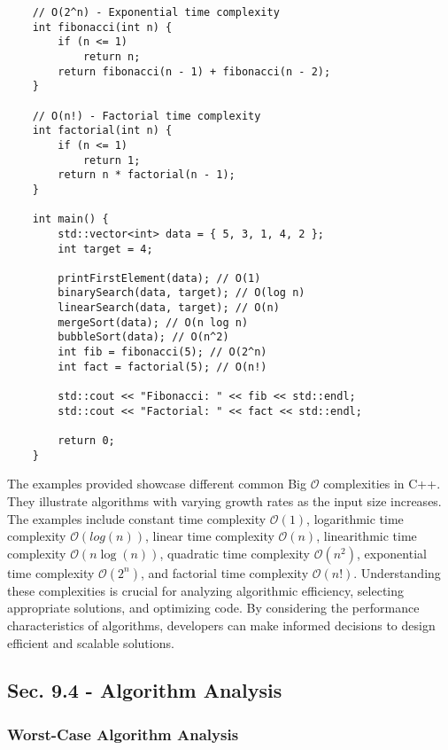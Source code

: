 \begin{solution}
\begin{verbatim}
    // O(2^n) - Exponential time complexity
    int fibonacci(int n) {
        if (n <= 1)
            return n;
        return fibonacci(n - 1) + fibonacci(n - 2);
    }

    // O(n!) - Factorial time complexity
    int factorial(int n) {
        if (n <= 1)
            return 1;
        return n * factorial(n - 1);
    }

    int main() {
        std::vector<int> data = { 5, 3, 1, 4, 2 };
        int target = 4;

        printFirstElement(data); // O(1)
        binarySearch(data, target); // O(log n)
        linearSearch(data, target); // O(n)
        mergeSort(data); // O(n log n)
        bubbleSort(data); // O(n^2)
        int fib = fibonacci(5); // O(2^n)
        int fact = factorial(5); // O(n!)

        std::cout << "Fibonacci: " << fib << std::endl;
        std::cout << "Factorial: " << fact << std::endl;

        return 0;
    }
    \end{verbatim}

    \horizontalline

    The examples provided showcase different common Big $\mathcal{O}$ complexities in C++. They illustrate algorithms with varying growth rates as the input size increases. The examples include constant time complexity $\mathcal{O}(1)$, logarithmic time complexity $\mathcal{O}(log{(n)})$, linear time complexity $\mathcal{O}(n)$, linearithmic time complexity $\mathcal{O}(n\log{(n)})$, quadratic time complexity $\mathcal{O}(n^2)$, 
    exponential time complexity $\mathcal{O}(2^n)$, and factorial time complexity $\mathcal{O}(n!)$. Understanding these complexities is crucial for analyzing algorithmic efficiency, selecting appropriate solutions, and optimizing code. By considering the performance characteristics of algorithms, developers can make informed decisions to design efficient and scalable solutions.
\end{solution}

\subsection*{Sec. 9.4 - Algorithm Analysis}

\subsubsection{Worst-Case Algorithm Analysis}

